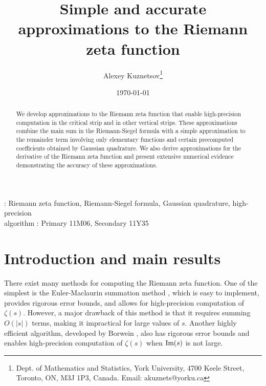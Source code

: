 \documentclass[12pt]{article}
\title{Simple and accurate approximations to the Riemann zeta function}
\author{ 
{Alexey Kuznetsov\footnote{Dept. of Mathematics and Statistics,  York University,
4700 Keele Street, Toronto, ON, M3J 1P3, Canada.  
  Email: akuznets@yorku.ca}} }
\date{\today}
\def\im{\textnormal {Im}}
\theoremstyle{definition}
\begin{document}
\maketitle


\begin{abstract}
We develop approximations to the Riemann zeta function that enable high-precision computation in the critical strip and in other vertical strips. These approximations combine the main sum in the Riemann-Siegel formula with a simple approximation to the remainder term involving only elementary functions and certain precomputed coefficients obtained by Gaussian quadrature. We also derive approximations for the derivative of the Riemann zeta function and present extensive numerical evidence demonstrating the accuracy of these approximations.
\end{abstract}
%
{\vskip 0.15cm}
 : Riemann zeta function, Riemann-Siegel formula, Gaussian quadrature, high-precision \\ algorithm
{\vskip 0.25cm}
 : Primary 11M06, Secondary 11Y35


\section{Introduction and main results}\label{section:Intro}


There exist many methods for computing  the Riemann zeta function. One of the simplest is the Euler-Maclaurin summation method
\cite{Borwein_2000,Johansson_2015,Rubinstein_2005}, which is easy to implement,  provides rigorous error bounds, and allows for high-precision computation of $\zeta(s)$. However, a major drawback of this method is that it requires summing  $O(|s|)$ terms, making it impractical for large values of $s$. Another highly efficient algorithm, developed by Borwein \cite{Borwein_2000b}, also has rigorous error bounds and enables high-precision computation of $\zeta(s)$ when $\im(s)$ is not large.   
\end{document}
